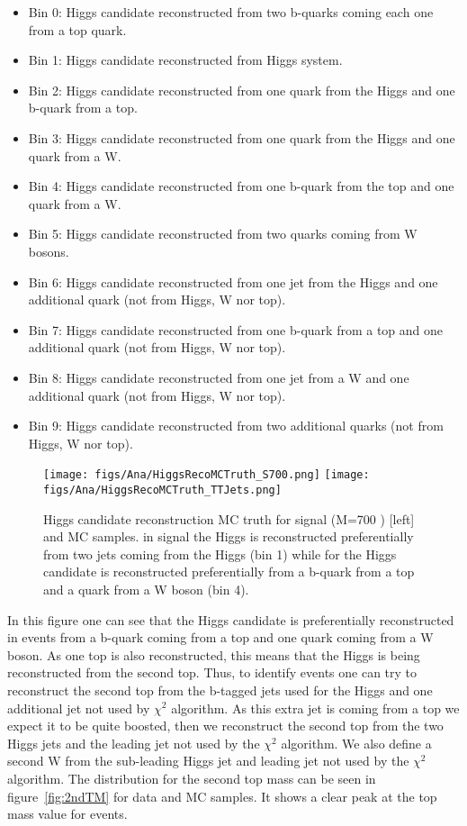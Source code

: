 \begin{itemize}
\item Bin 0: Higgs candidate reconstructed from two b-quarks coming each one from a top quark.
\item Bin 1: Higgs candidate reconstructed from Higgs \bbbar system.
\item Bin 2: Higgs candidate reconstructed from one quark from the Higgs and one b-quark from a top.
\item Bin 3: Higgs candidate reconstructed from one quark from the Higgs and one quark from a W.
\item Bin 4: Higgs candidate reconstructed from one b-quark from the top and one quark from a W.
\item Bin 5: Higgs candidate reconstructed from two quarks coming from W bosons.
\item Bin 6: Higgs candidate reconstructed from one jet from the Higgs and one additional quark (not from Higgs, W nor top).
\item Bin 7: Higgs candidate reconstructed from one b-quark from a top and one additional quark (not from Higgs, W nor top).
\item Bin 8: Higgs candidate reconstructed from one jet from a W and one additional quark (not from Higgs, W nor top).
\item Bin 9: Higgs candidate reconstructed from two additional quarks (not from Higgs, W nor top).
\end{itemize}

\begin{figure}[!Hhtbp]
  \begin{center}
    \texttt{[image: figs/Ana/HiggsRecoMCTruth\_S700.png]}
    \texttt{[image: figs/Ana/HiggsRecoMCTruth\_TTJets.png]}
    \caption{Higgs candidate reconstruction MC truth for signal (M=700 \GeVcc) [left] and \ttbar [right] MC samples. in signal the Higgs is reconstructed preferentially from two jets coming from the Higgs (bin 1) while for \ttbar the Higgs candidate is reconstructed preferentially from a b-quark from a top and a quark from a W boson (bin 4).}
    \label{fig:RecohiggsMCTruth}
  \end{center}
\end{figure}

In this figure one can see that the Higgs candidate is preferentially reconstructed in \ttbar events from a b-quark coming from a top and one quark coming from a W boson. As one top is also reconstructed, this means that the Higgs is being reconstructed from the second top. Thus, to identify \ttbar events one can try to reconstruct the second top from the b-tagged jets used for the Higgs and one additional jet not used by $\chi^{2}$ algorithm. As this extra jet is coming from a top we expect it to be quite boosted, then we reconstruct the second top from the two Higgs jets and the leading jet not used by the $\chi^{2}$ algorithm. We also define a second W from the sub-leading Higgs jet and leading jet not used by the $\chi^{2}$ algorithm. The distribution for the second top mass can be seen in figure~\ref{fig:2ndTM} for data and MC samples. It shows a clear peak at the top mass value for \ttbar events.

